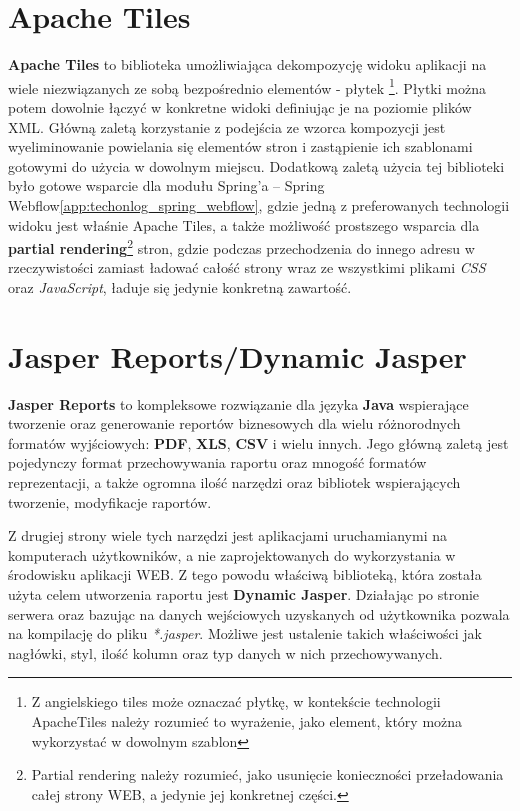 \section{Apache Tiles}\label{tech:tiles}
	\textbf{Apache Tiles} to biblioteka umożliwiająca dekompozycję widoku aplikacji na wiele niezwiązanych ze sobą bezpośrednio elementów - płytek \footnote{Z angielskiego tiles może oznaczać płytkę, w kontekście technologii ApacheTiles należy rozumieć to wyrażenie, jako element, który można wykorzystać w dowolnym szablon}. Płytki można potem dowolnie łączyć w konkretne widoki definiując je na poziomie plików XML. Główną zaletą korzystanie z podejścia ze wzorca kompozycji jest wyeliminowanie powielania się elementów stron i zastąpienie ich szablonami gotowymi do użycia w dowolnym miejscu. Dodatkową zaletą użycia tej biblioteki było gotowe wsparcie dla modułu Spring’a – Spring Webflow\ref{app:techonlog_spring_webflow}, gdzie jedną z preferowanych technologii widoku jest właśnie Apache Tiles, a także możliwość prostszego wsparcia dla \textbf{partial rendering}\footnote{Partial rendering należy rozumieć, jako usunięcie konieczności przeładowania całej strony WEB, a jedynie jej konkretnej części.} stron, gdzie podczas przechodzenia do innego adresu w rzeczywistości zamiast ładować całość strony wraz ze wszystkimi plikami \textit{CSS} oraz \textit{JavaScript}, ładuje się jedynie konkretną zawartość.
	
\section{Jasper Reports/Dynamic Jasper}\label{tech:jasperReports}
	\textbf{Jasper Reports} to kompleksowe rozwiązanie dla języka \textbf{Java} wspierające tworzenie oraz generowanie reportów
	biznesowych dla wielu różnorodnych formatów wyjściowych: \textbf{PDF}, \textbf{XLS}, \textbf{CSV} i wielu innych. Jego główną
	zaletą jest pojedynczy format przechowywania raportu oraz mnogość formatów reprezentacji, a także ogromna ilość
	narzędzi oraz bibliotek wspierających tworzenie, modyfikacje raportów. 

	Z drugiej strony wiele tych narzędzi jest aplikacjami uruchamianymi na komputerach użytkowników, a nie
	zaprojektowanych do wykorzystania w środowisku aplikacji WEB. Z tego powodu właściwą biblioteką, która została
	użyta celem utworzenia raportu jest \textbf{Dynamic Jasper}. Działając po stronie serwera oraz bazując
	na danych wejściowych uzyskanych od użytkownika pozwala na kompilację do pliku \textit{*.jasper}. 
	Możliwe jest ustalenie takich właściwości jak nagłówki, styl, ilość kolumn oraz typ danych w nich przechowywanych.

